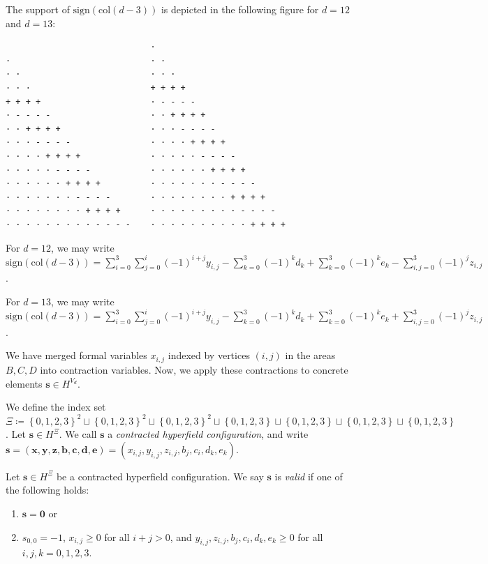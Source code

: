 \begin{example}
    The support of \( \mathrm{sign}(\mathrm{col}(d-3)) \) is depicted in the following figure for \( d = 12 \) and \( d = 13 \):
    \begin{verbatim}
                             · 
·                            · ·    
· ·                          · · ·
· · ·                        + + + + 
+ + + +                      · - - - - 
· - - - -                    · · + + + + 
· · + + + +                  · · · - - - - 
· · · - - - -                · · · · + + + + 
· · · · + + + +              · · · · · - - - - 
· · · · · - - - -            · · · · · · + + + + 
· · · · · · + + + +          · · · · · · · - - - - 
· · · · · · · - - - -        · · · · · · · · + + + + 
· · · · · · · · + + + +      · · · · · · · · · - - - -
· · · · · · · · · - - - -    · · · · · · · · · · + + + +
    \end{verbatim}
    For \( d = 12 \), we may write \( \mathrm{sign}(\mathrm{col}(d-3)) = \sum^3_{i=0}\sum^i_{j=0} (-1)^{i+j}y_{i,j} - \sum^3_{k=0}(-1)^{k}d_k  + \sum^3_{k=0}(-1)^{k}e_k - \sum^3_{i,j=0}(-1)^{j}z_{i,j} \).
    
    For \( d = 13 \), we may write \( \mathrm{sign}(\mathrm{col}(d-3)) = \sum^3_{i=0}\sum^i_{j=0} (-1)^{i+j}y_{i,j} - \sum^3_{k=0}(-1)^{k}d_k  + \sum^3_{k=0}(-1)^{k}e_k + \sum^3_{i,j=0}(-1)^{j}z_{i,j} \).
\end{example}

We have merged formal variables \( x_{i,j} \) indexed by vertices \( (i,j) \) in the areas \( B, C, D \) into contraction variables. Now, we apply these contractions to concrete elements \( \mathbf{s} \in H^{V_d} \).

\begin{definition}
    We define the index set \(  \Xi \coloneqq \left\{ 0,1,2,3 \right\}^2 \sqcup \left\{ 0,1,2,3 \right\}^2 \sqcup \left\{ 0,1,2,3 \right\}^2 \sqcup \left\{ 0,1,2,3 \right\} \sqcup \left\{ 0,1,2,3 \right\} \sqcup \left\{ 0,1,2,3 \right\} \sqcup \left\{ 0,1,2,3 \right\} \).
    Let \( \mathbf{s} \in H^{\Xi} \). We call \( \mathbf{s} \) a \emph{contracted hyperfield configuration}, and write \( \mathbf{s} = (\mathbf{x}, \mathbf{y}, \mathbf{z}, \mathbf{b}, \mathbf{c}, \mathbf{d}, \mathbf{e}) = (x_{i,j}, y_{i,j}, z_{i,j}, b_j, c_i, d_k, e_k) \).
\end{definition}

\begin{definition}
    Let \( \mathbf{s} \in H^{\Xi}\) be a {contracted hyperfield configuration}.
    We say \( \mathbf{s} \) is \emph{valid} if one of the following holds:
    \begin{enumerate}
        \item \( \mathbf{s} = \mathbf{0} \) or
        \item \( s_{0,0} = -1 \), \( x_{i,j} \geq 0 \) for all \( i+j > 0 \), and \(  y_{i,j}, z_{i,j}, b_j, c_i, d_k, e_k \geq 0 \) for all \( i,j,k = 0,1,2,3 \).
    \end{enumerate}
\end{definition}

